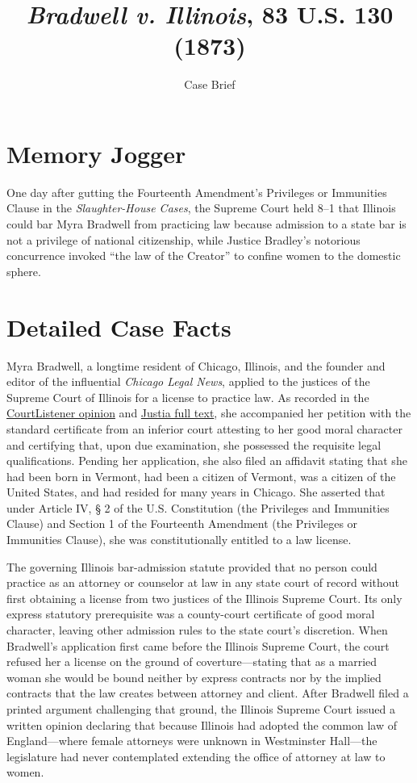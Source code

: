 \documentclass[12pt]{article}
\title{\textit{Bradwell v. Illinois}, 83 U.S. 130 (1873)}
\subtitle{Case Brief}
\author{}
\date{}
\begin{document}
\maketitle

\section{Memory Jogger}

One day after gutting the Fourteenth Amendment's Privileges or Immunities Clause in the \textit{Slaughter-House Cases}, the Supreme Court held 8--1 that Illinois could bar Myra Bradwell from practicing law because admission to a state bar is not a privilege of national citizenship, while Justice Bradley's notorious concurrence invoked ``the law of the Creator'' to confine women to the domestic sphere.

\section{Detailed Case Facts}

Myra Bradwell, a longtime resident of Chicago, Illinois, and the founder and editor of the influential \textit{Chicago Legal News}, applied to the justices of the Supreme Court of Illinois for a license to practice law. As recorded in the \href{https://www.courtlistener.com/opinion/88662/bradwell-v-state/}{CourtListener opinion} and \href{https://supreme.justia.com/cases/federal/us/83/130/}{Justia full text}, she accompanied her petition with the standard certificate from an inferior court attesting to her good moral character and certifying that, upon due examination, she possessed the requisite legal qualifications. Pending her application, she also filed an affidavit stating that she had been born in Vermont, had been a citizen of Vermont, was a citizen of the United States, and had resided for many years in Chicago. She asserted that under Article IV, \S{} 2 of the U.S. Constitution (the Privileges and Immunities Clause) and Section 1 of the Fourteenth Amendment (the Privileges or Immunities Clause), she was constitutionally entitled to a law license.

The governing Illinois bar-admission statute provided that no person could practice as an attorney or counselor at law in any state court of record without first obtaining a license from two justices of the Illinois Supreme Court. Its only express statutory prerequisite was a county-court certificate of good moral character, leaving other admission rules to the state court's discretion. When Bradwell's application first came before the Illinois Supreme Court, the court refused her a license on the ground of coverture---stating that as a married woman she would be bound neither by express contracts nor by the implied contracts that the law creates between attorney and client. After Bradwell filed a printed argument challenging that ground, the Illinois Supreme Court issued a written opinion declaring that because Illinois had adopted the common law of England---where female attorneys were unknown in Westminster Hall---the legislature had never contemplated extending the office of attorney at law to women.
\end{document}
